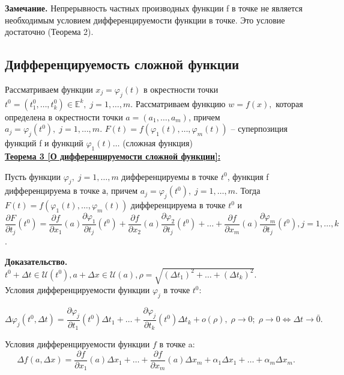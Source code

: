 \documentclass[a4paper,12pt]{article} %
\begin{document}
 \textbf{Замечание.} Непрерывность частных производных функции f в точке не является необходимым условием дифференцируемости функции в точке. Это условие достаточно (Теорема 2).\\
	 
 \subsection{Дифференцируемость сложной функции}
 
 Рассматриваем функции $x_j = \varphi_j(t)$ в окрестности точки $t^0 = (t_1^0, \ldots, t_k^0)\in \mathds{E}^k, \; j = 1, \ldots, m$. Рассматриваем функцию $w = f(x),$ которая определена в окрестности точки $a = (a_1, \ldots, a_m)$, причем $a_j = \varphi_j(t^0), \; j = 1, \ldots, m$. $F(t) = f(\varphi_1(t), \ldots, \varphi_m(t))$ -- суперпозиция функций f и функций $\varphi_1(t) \ldots$ (сложная функция)\\
 
 \underline{\textbf{Теорема 3 [О дифференцируемости сложной функции]:}}
 
 Пусть функции $\varphi_j, \; j = 1, \ldots, m$ дифференцируемы в точке $t^0$, функция f дифференцируема в точке а, причем $a_j = \varphi_j(t^0), \; j = 1, \ldots,m$. Тогда $F(t) = f(\varphi_1(t), \ldots, \varphi_m(t))$ дифференцируема в точке $t^0$ и 
 \[\frac{\partial F}{\partial t_j}(t^0) = \frac{\partial f}{\partial x_1}(a) \frac{\partial \varphi_1}{\partial t_j}(t^0	) + \frac{\partial f}{\partial x_2}(a) \frac{\partial \varphi_2}{\partial t_j}(t^0	) + \ldots + \frac{\partial f}{\partial x_m}(a) \frac{\partial \varphi_m}{\partial t_j}(t^0), j = 1, \ldots, k\].
	 
 \textbf{Доказательство.} $t^0 + \Delta t \in \mathscr{U}(t^0), a + \Delta x \in \mathscr{U}(a), \rho = \sqrt{(\Delta t_1)^2 + \ldots + (\Delta t_k)^2}$.\\
 
 Условия дифференцируемости функции $\varphi_j$ в точке $t^0$:
 
  \[\Delta \varphi_j(t^0, \Delta t) = \frac{\partial \varphi_j}{\partial t_1}(t^0)\Delta t_1 + \ldots + \frac{\partial \varphi_j}{\partial t_k}(t^0)\Delta t_k + o(\rho), \; \rho \to 0; \; \rho \to 0 \Leftrightarrow \Delta t \to \bar0.\]
  
 Условия дифференцируемости функции $f$ в точке a:
 \[\Delta f(a, \Delta x) = \frac {\partial f}{\partial x_1}(a)\Delta x_1 + \ldots + \frac {\partial f}{\partial x_m}(a)\Delta x_m + \alpha_1 \Delta x_1 + \ldots + \alpha_m \Delta x_m.\]
 
\end{document}
